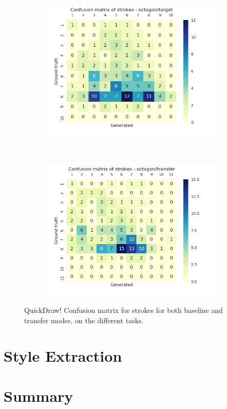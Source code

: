 \begin{figure}
        ~
        \begin{subfigure}[tb]{0.45\textwidth}
            \includegraphics[width=\textwidth]{images/sota/quickdraw_results/quickdraw_octagon_target_strokes_heatmap.png}
        \end{subfigure}
        ~
        \begin{subfigure}[tb]{0.45\textwidth}
            \includegraphics[width=\textwidth]{images/sota/quickdraw_results/quickdraw_octagon_transfer_strokes_heatmap.png}
        \end{subfigure}

        \caption{QuickDraw! Confusion matrix for strokes for both baseline and transfer modes, on the different tasks.}
        \label{fig:quickdraw_strokes_cnf}
      \end{figure}


\section{Style Extraction}

\section{Summary}
